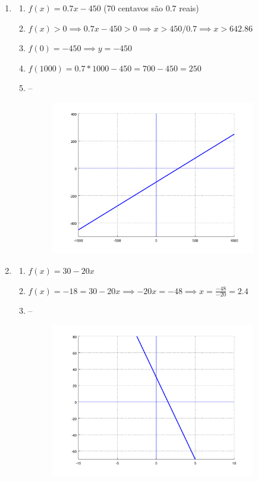 \documentclass[11pt]{article}
\begin{document}
\begin{enumerate}
	\item 
	\begin{enumerate}
		\item $f(x) = 0.7x - 450$ (70 centavos são $0.7$ reais)
		\item $f(x) > 0 \implies 0.7x - 450 > 0 \implies x > 450/0.7 \implies
			x > 642.86$
		\item $f(0) = -450 \implies y = -450$
		\item $f(1000) = 0.7*1000 - 450 = 700 - 450 = 250$
		\item -- 
			\begin{figure}[H]
				\centering
				\includegraphics[width=0.9\textwidth]{imgs/ex2c.png}
			\end{figure}
	\end{enumerate}

	\item 
	\begin{enumerate}
		\item $f(x) = 30 - 20x$
		\item $f(x) = -18 = 30 - 20x \implies -20x = -48 \implies x = 
			\frac{-48}{-20} = 2.4$
		\item -- 
			\begin{figure}[H]
				\centering
				\includegraphics[width=0.9\textwidth]{imgs/ex3c.png}
			\end{figure}
	\end{enumerate}


\end{enumerate}
\end{document}
